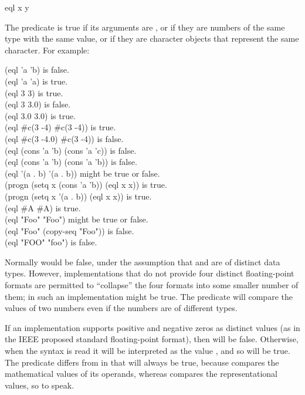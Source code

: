 \begin{defun}[Function]
eql x y

The  predicate is true if its arguments are ,
or if they are numbers of the same type with the same value,
or if they are character objects
that represent the same character.
For example:
\begin{lisp}
(eql 'a 'b) \textrm{is false.} \\
(eql 'a 'a) \textrm{is true.} \\
(eql 3 3) \textrm{is true.} \\
(eql 3 3.0) \textrm{is false.} \\
(eql 3.0 3.0) \textrm{is true.} \\
(eql \#c(3 -4) \#c(3 -4)) \textrm{is true.} \\
(eql \#c(3 -4.0) \#c(3 -4)) \textrm{is false.} \\
(eql (cons 'a 'b) (cons 'a 'c)) \textrm{is false.} \\
(eql (cons 'a 'b) (cons 'a 'b)) \textrm{is false.} \\
(eql '(a . b) '(a . b)) \textrm{might be true or false.} \\
(progn (setq x (cons 'a 'b)) (eql x x)) \textrm{is true.} \\
(progn (setq x '(a . b)) (eql x x)) \textrm{is true.} \\
(eql \#{\Xbackslash}A \#{\Xbackslash}A) \textrm{is true.} \\
(eql "Foo" "Foo") \textrm{might be true or false.} \\
(eql "Foo" (copy-seq "Foo")) \textrm{is false.} \\
(eql "FOO" "foo") \textrm{is false.}
\end{lisp}

Normally  would be false, under the assumption
that  and  are of distinct data types.
However, implementations that do not provide four distinct floating-point
formats are permitted to ``collapse'' the four formats into some
smaller number of them; in such an implementation 
might be true.  The predicate \cdf{=} will compare
the values of two numbers even if the numbers are of different types.

If an implementation supports positive and negative zeros as distinct
values (as in the IEEE proposed standard floating-point format),
then  will be false.  Otherwise, when the syntax
 is read it will be interpreted as the value ,
and so  will be true.  The predicate \cdf{=}
differs from  in that  will always be true,
because \cdf{=} compares the mathematical values of its operands,
whereas  compares the representational values, so to speak.


\end{defun}
